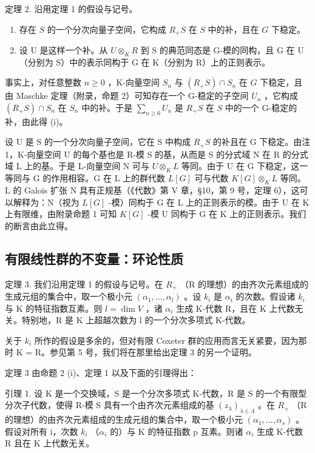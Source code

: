定理 2. 沿用定理 1 的假设与记号。

\begin{enumerate}
\def\labelenumi{(\roman{enumi})}
\item
  存在 \(S\) 的一个分次向量子空间，它构成 \(R_{+}S\) 在 \(S\) 中的补，且在 \(G\) 下稳定。
\item
  设 U 是这样一个补。从 \(U \otimes_{K} R\) 到 S 的典范同态是 G-模的同构，且 G 在 U（分别为 S）中的表示同构于 G 在 K（分别为 R）上的正则表示。
\end{enumerate}

事实上，对任意整数 \(n \geqslant 0\) ，K-向量空间 \(S_n\) 与 \((R_+S) \cap S_n\) 在 \(G\) 下稳定，且由 Maschke 定理（附录，命题 2）可知存在一个 G-稳定的子空间 \(U_n\) ，它构成 \((R_+S) \cap S_n\) 在 \(S_n\) 中的补。于是 \(\sum_{n \geqslant 0} U_n\) 是 \(R_+S\) 在 \(S\) 中的一个 G-稳定的补，由此得 (i)。

设 U 是 S 的一个分次向量子空间，它在 S 中构成 \(R_{+}S\) 的补且在 G 下稳定。由注 1，K-向量空间 U 的每个基也是 R-模 S 的基，从而是 S 的分式域 N 在 R 的分式域 L 上的基。于是 L-向量空间 N 可与 \(U \otimes_{K} L\) 等同。由于 U 在 G 下稳定，这一等同与 G 的作用相容。G 在 L 上的群代数 \(L[G]\) 可与代数 \(K[G] \otimes_{K} L\) 等同。L 的 Galois 扩张 N 具有正规基（《代数》第 V 章，§10，第 9 号，定理 6），这可以解释为：N（视为 \(L[G]\) -模）同构于 G 在 L 上的正则表示的模。由于 U 在 K 上有限维，由附录命题 1 可知 \(K[G]\) -模 U 同构于 G 在 K 上的正则表示。我们的断言由此立得。

\subsection{有限线性群的不变量：环论性质}

定理 3. 我们沿用定理 1 的假设与记号。在 \(R_{+}\) （R 的理想）的由齐次元素组成的生成元组的集合中，取一个极小元 \((\alpha_{1},\ldots,\alpha_{l})\) 。设 \(k_{i}\) 是 \(\alpha_{i}\) 的次数。假设诸 \(k_{i}\) 与 K 的特征指数互素。则 \(l=\dim V\) ，诸 \(\alpha_{i}\) 生成 K-代数 R，且在 K 上代数无关。特别地，R 是 K 上超越次数为 l 的一个分次多项式 K-代数。

关于 \(k_{i}\) 所作的假设是多余的，但对有限 Coxeter 群的应用而言无关紧要，因为那时 K = R。参见第 5 号，我们将在那里给出定理 3 的另一个证明。

定理 3 由命题 2 (i)、定理 1 以及下面的引理得出：

引理 1. 设 K 是一个交换域，S 是一个分次多项式 K-代数，R 是 S 的一个有限型分次子代数，使得 R-模 S 具有一个由齐次元素组成的基 \((z_{\lambda})_{\lambda \in \Lambda}\) 。在 \(R_{+}\) （R 的理想）的由齐次元素组成的生成元组的集合中，取一个极小元 \((\alpha_{1}, \ldots, \alpha_{s})\) 。假设对所有 i，次数 \(k_{i}\) （\(\alpha_{i}\) 的）与 K 的特征指数 p 互素。则诸 \(\alpha_{i}\) 生成 K-代数 R 且在 K 上代数无关。


